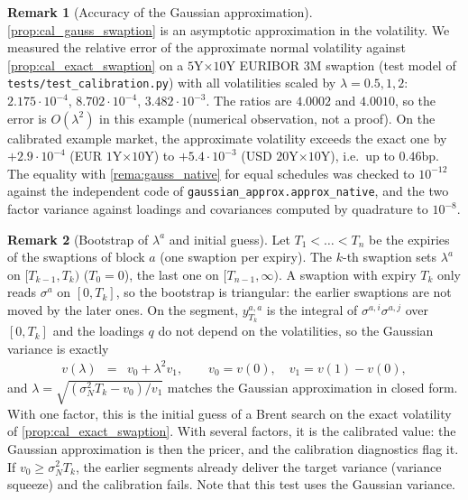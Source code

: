 \documentclass[11pt,english]{amsart}
\theoremstyle{definition}
\newtheorem{rema}{Remark}
\begin{document}
\begin{rema}[Accuracy of the Gaussian approximation]\label{rema:cal_gauss_swaption_accuracy}
\autoref{prop:cal_gauss_swaption} is an asymptotic approximation in the volatility. We measured the relative error of the approximate normal volatility against \autoref{prop:cal_exact_swaption} on a $5$Y$\times10$Y EURIBOR 3M swaption (test model of \texttt{tests/test\_calibration.py}) with all volatilities scaled by $\lambda = 0.5, 1, 2$: $2.175\cdot10^{-4}$, $8.702\cdot10^{-4}$, $3.482\cdot10^{-3}$. The ratios are $4.0002$ and $4.0010$, so the error is $O(\lambda^2)$ in this example (numerical observation, not a proof). On the calibrated example market, the approximate volatility exceeds the exact one by $+2.9\cdot10^{-4}$ (EUR $1$Y$\times10$Y) to $+5.4\cdot10^{-3}$ (USD $20$Y$\times10$Y), i.e.\ up to $0.46$bp. The equality with \autoref{rema:gauss_native} for equal schedules was checked to $10^{-12}$ against the independent code of \texttt{gaussian\_approx.approx\_native}, and the two factor variance against loadings and covariances computed by quadrature to $10^{-8}$.
\end{rema}

\begin{rema}[Bootstrap of $\lambda^a$ and initial guess]\label{rema:cal_swaption_bootstrap}
Let $T_1<\ldots<T_n$ be the expiries of the swaptions of block $a$ (one swaption per expiry). The $k$-th swaption sets $\lambda^a$ on $[T_{k-1},T_k)$ ($T_0 = 0$), the last one on $[T_{n-1},\infty)$. A swaption with expiry $T_k$ only reads $\sigma^a$ on $[0,T_k]$, so the bootstrap is triangular: the earlier swaptions are not moved by the later ones. On the segment, $y^{a,a}_{T_k}$ is the integral of $\sigma^{a,i}\sigma^{a,j}$ over $[0,T_k]$ and the loadings $q$ do not depend on the volatilities, so the Gaussian variance is exactly
\begin{eqnarray}
  v(\lambda) &=& v_0 + \lambda^2 v_1 , \qquad v_0 = v(0), \quad v_1 = v(1) - v(0) ,
\end{eqnarray}
and $\lambda = \sqrt{(\sigma_N^2T_k - v_0)/v_1}$ matches the Gaussian approximation in closed form. With one factor, this is the initial guess of a Brent search on the exact volatility of \autoref{prop:cal_exact_swaption}. With several factors, it is the calibrated value: the Gaussian approximation is then the pricer, and the calibration diagnostics flag it. If $v_0\ge\sigma_N^2T_k$, the earlier segments already deliver the target variance (variance squeeze) and the calibration fails. Note that this test uses the Gaussian variance.
\end{rema}
\end{document}
